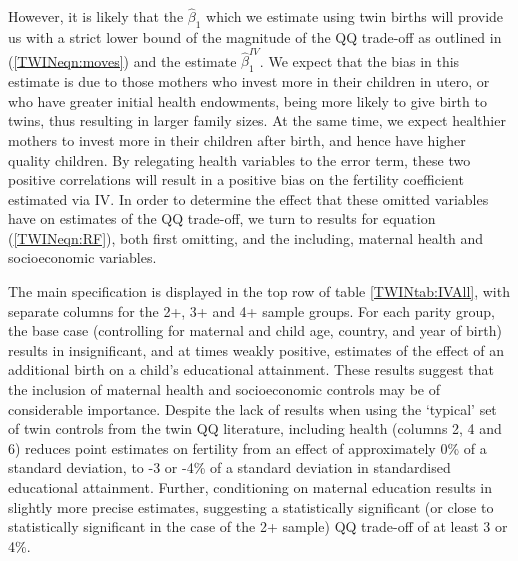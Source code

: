 However, it is likely that the $\hat\beta_1$ which we estimate using twin births 
will provide us with a strict lower bound of the magnitude of the QQ trade-off 
as outlined in (\ref{TWINeqn:moves}) and the estimate $\hat\beta_1^{IV}$. We 
expect that the bias in this estimate is due to those mothers who invest more in 
their children in utero, or who have greater initial health endowments, being 
more likely to give birth to twins, thus resulting in larger family sizes. At 
the same time, we expect healthier mothers to invest more in their children after 
birth, and hence have higher quality children. By relegating health variables to 
the error term, these two positive correlations will result in a positive bias on 
the fertility coefficient estimated via IV. In order to determine the effect that 
these omitted variables have on estimates of the QQ trade-off, we turn to results 
for equation (\ref{TWINeqn:RF}), both first omitting, and the including, 
maternal health and socioeconomic variables.

The main specification is displayed in the top row of table \ref{TWINtab:IVAll}, 
with separate columns for the 2+, 3+ and 4+ sample groups. For each parity 
group, the base case (controlling for maternal and child age, country, and year 
of birth) results in insignificant, and at times weakly positive, estimates of 
the effect of an additional birth on a child's educational attainment. These 
results suggest that the inclusion of maternal health and socioeconomic controls 
may be of considerable importance. Despite the lack of results when using
the `typical' set of twin controls from the twin QQ literature, including 
health (columns 2, 4 and 6) reduces point estimates on fertility from an effect 
of approximately 0\% of a standard deviation, to -3 or -4\% of a standard 
deviation in standardised educational attainment. Further, conditioning on 
maternal education results in slightly more precise estimates, suggesting a 
statistically significant (or close to statistically significant in the case
of the 2+ sample) QQ trade-off of at least 3 or 4\%.

